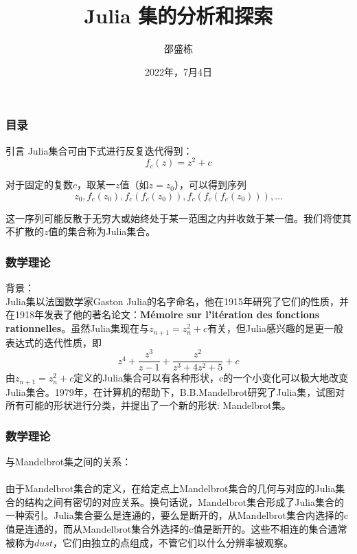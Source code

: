 \documentclass[UTF8]{beamer}
\title[Analysis and exploration of Julia sets]
{Julia 集的分析和探索}
\author[SHAO Shengdong]
{邵盛栋}
\institute[3200103951]
{
	信息与计算科学
	\and
	3200103951
}
\date[July 4]
{2022年，7月4日}
\begin{document}
	\maketitle
	\begin{frame}
		\frametitle{目录}
		\tableofcontents {}
		\tableofcontents {}
		\tableofcontents {}
		\tableofcontents {}
		\tableofcontents {}
	\end{frame}
	\begin{frame}{引言}
		Julia集合可由下式进行反复迭代得到：
		\[f_{c}(z)=z^{2}+c\]
		
		对于固定的复数$ c $，取某一$ z $值（如$ z=z_{0} $），可以得到序列
		\[z_{0},f_{c}(z_{0}),f_{c}(f_{c}(z_{0})),f_{c}(f_{c}(f_{c}(z_{0}))),\dots\]
		
		这一序列可能反散于无穷大或始终处于某一范围之内并收敛于某一值。我们将使其不扩散的$ z $值的集合称为Julia集合。
	\end{frame}
	\begin{frame}
		\frametitle{数学理论}
		{\Large 背景：}\\
		Julia集以法国数学家Gaston Julia的名字命名，他在1915年研究了它们的性质，并在1918年发表了他的著名论文：\textbf{Mémoire sur l'itération des fonctions rationnelles}。虽然Julia集现在与$ z_{n+1}=z_{n}^{2}+c $有关，但Julia感兴趣的是更一般表达式的迭代性质，即
		\[z^{4}+\dfrac{z^{3}}{z-1}+\dfrac{z^{2}}{z^{3}+4z^{2}+5}+c\]
		由$ z_{n+1}=z_{n}^{2}+c $定义的Julia集合可以有各种形状，c的一个小变化可以极大地改变Julia集合。1979年，在计算机的帮助下，B.B.Mandelbrot研究了Julia集，试图对所有可能的形状进行分类，并提出了一个新的形状: Mandelbrot集\cite{douady1986julia}。
	\end{frame}
	\begin{frame}
		\frametitle{数学理论}
		{\Large 与Mandelbrot集之间的关系：}
		\\ \hspace*{\fill} \\
		由于Mandelbrot集合的定义，在给定点上Mandelbrot集合的几何与对应的Julia集合的结构之间有密切的对应关系。换句话说，Mandelbrot集合形成了Julia集合的一种索引。\cite{lei1990similarity}Julia集合要么是连通的，要么是断开的，从Mandelbrot集合内选择的c值是连通的，而从Mandelbrot集合外选择的c值是断开的。这些不相连的集合通常被称为$ dust $，它们由独立的点组成，不管它们以什么分辨率被观察\cite{Juliaset}。
	\end{frame}
\end{document}
